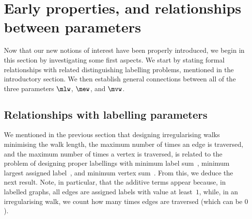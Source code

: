 \documentclass[a4paper,11pt,dvipsnames]{elsarticle}
\newcommand{\sam}[1]{\todo[size=\tiny,color=red!20!white]{\textbf{Sam:} #1}}
\newcommand{\sam}[1]{}
\begin{document}
\section{Early properties, and relationships between parameters}\label{section:early-properties}

Now that our new notions of interest have been properly introduced, we begin in this section by investigating some first aspects. We start by stating formal relationships with related distinguishing labelling problems,
mentioned in the introductory section. We then establish general connections between all of the three parameters $\mlw$, $\mew$, and $\mvw$.

\subsection{Relationships with labelling parameters}\label{subsection:relation-labellings}

We mentioned in the previous section that designing irregularising walks minimising the walk length, the maximum number of times an edge is traversed,
and the maximum number of times a vertex is traversed, is related to the problem of designing proper labellings with minimum label sum~\cite{BFN22},
minimum largest assigned label~\cite{KLT04}, and minimum vertex sum~\cite{BLLN21}.
From this, we deduce the next result. Note, in particular, that the additive terms appear because, in labelled graphs, all edges are assigned labels with value at least~$1$,
while, in an irregularising walk, we count how many times edges are traversed (which can be $0$).
\end{document}
